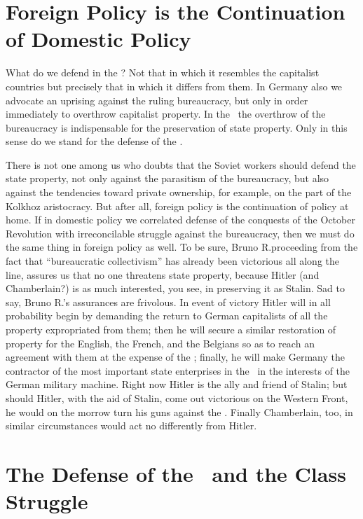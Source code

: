 \section*{Foreign Policy is the Continuation of Domestic Policy}

What do we defend in the \USSR? Not that in which it resembles the capitalist countries but precisely that in which it differs from them. In Germany also we advocate an uprising against the ruling bureaucracy, but only in order immediately to overthrow capitalist property. In the \USSR\ the overthrow of the bureaucracy is indispensable for the preservation of state property. Only in this sense do we stand for the defense of the \USSR.

There is not one among us who doubts that the Soviet workers should defend the state property, not only against the parasitism of the bureaucracy, but also against the tendencies toward private ownership, for example, on the part of the Kolkhoz aristocracy. But after all, foreign policy is the continuation of policy at home. If in domestic policy we correlated defense of the conquests of the October Revolution with irreconcilable struggle against the bureaucracy, then we must do the same thing in foreign policy as well. To be sure, Bruno R.\@ proceeding from the fact that “bureaucratic collectivism” has already been victorious all along the line, assures us that no one threatens state property, because Hitler (and Chamberlain?) is as much interested, you see, in preserving it as Stalin. Sad to say, Bruno R.’s assurances are frivolous. In event of victory Hitler will in all probability begin by demanding the return to German capitalists of all the property expropriated from them; then he will secure a similar restoration of property for the English, the French, and the Belgians so as to reach an agreement with them at the expense of the \USSR; finally, he will make Germany the contractor of the most important state enterprises in the \USSR\ in the interests of the German military machine. Right now Hitler is the ally and friend of Stalin; but should Hitler, with the aid of Stalin, come out victorious on the Western Front, he would on the morrow turn his guns against the \USSR. Finally Chamberlain, too, in similar circumstances would act no differently from Hitler.

\section*{The Defense of the \USSR\ and the Class Struggle}

